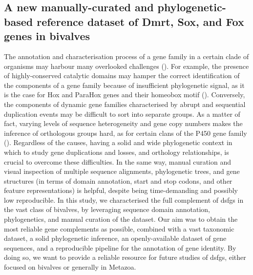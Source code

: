 \subsection{A new manually-curated and phylogenetic-based reference dataset of Dmrt, Sox, and Fox genes in bivalves}
The annotation and characterisation process of a gene family in a certain clade of organisms may harbour many overlooked challenges (). For example, the presence of highly-conserved catalytic domains may hamper the correct identification of the components of a gene family because of insufficient phylogenetic signal, as it is the case for Hox and ParaHox genes and their homeobox motif (). Conversely, the components of dynamic gene families characterised by abrupt and sequential duplication events may be difficult to sort into separate groups. As a matter of fact, varying levels of sequence heterogeneity and gene copy numbers makes the inference of orthologous groups hard, as for certain clans of the P450 gene family (). Regardless of the causes, having a solid and wide phylogenetic context in which to study gene duplications and losses, and orthology relationships, is crucial to overcome these difficulties. In the same way, manual curation and visual inspection of multiple sequence alignments, phylogenetic trees, and gene structures (in terms of domain annotation, start and stop codons, and other feature representations) is helpful, despite being time-demanding and possibly low reproducible. In this study, we characterised the full complement of \glspl{dsfg} in the vast class of bivalves, by leveraging sequence domain annotation, phylogenetics, and manual curation of the dataset. Our aim was to obtain the most reliable gene complements as possible, combined with a vast taxonomic dataset, a solid phylogenetic inference, an openly-available dataset of gene sequences, and a reproducible pipeline for the annotation of gene identity. By doing so, we want to provide a reliable resource for future studies of \glspl{dsfg}, either focused on bivalves or generally in Metazoa.

